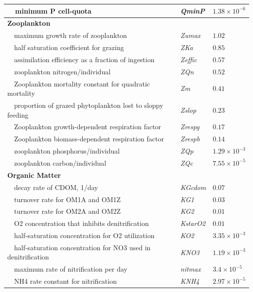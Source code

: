 \documentclass[preprint]{elsarticle}\usepackage[]{graphicx}\usepackage[]{color}
\begin{document}
\begin{table}[!tbp]
{\begin{center}
\begin{tabular}{lll}
~~minimum P cell-quota&\textit{QminP}&$1.38\times 10^{-6}$\tabularnewline
\hline
{\bfseries Zooplankton}&&\tabularnewline
~~maximum growth rate of zooplankton&\textit{Zumax}&$1.02$\tabularnewline
~~half saturation coefficient for grazing&\textit{ZKa}&$0.85$\tabularnewline
~~assimilation efficiency as a fraction of ingestion&\textit{Zeffic}&$0.57$\tabularnewline
~~zooplankton nitrogen/individual&\textit{ZQn}&$0.52$\tabularnewline
~~Zooplankton mortality constant for quadratic mortality&\textit{Zm}&$0.41$\tabularnewline
~~proportion of grazed phytoplankton lost to sloppy feeding&\textit{Zslop}&$0.23$\tabularnewline
~~Zooplankton growth-dependent respiration factor&\textit{Zrespg}&$0.17$\tabularnewline
~~Zooplankton biomass-dependent respiration factor&\textit{Zrespb}&$0.14$\tabularnewline
~~zooplankton phosphorus/individual&\textit{ZQp}&$1.29\times 10^{-3}$\tabularnewline
~~zooplankton carbon/individual&\textit{ZQc}&$7.55\times 10^{-5}$\tabularnewline
\hline
{\bfseries Organic Matter}&&\tabularnewline
~~decay rate of CDOM, 1/day&\textit{KGcdom}&$0.07$\tabularnewline
~~turnover rate for OM1A and OM1Z&\textit{KG1}&$0.03$\tabularnewline
~~turnover rate for OM2A and OM2Z&\textit{KG2}&$0.01$\tabularnewline
~~O2 concentration that inhibits denitrification&\textit{KstarO2}&$0.01$\tabularnewline
~~half-saturation concentration for O2 utilization&\textit{KO2}&$3.35\times 10^{-3}$\tabularnewline
~~half-saturation concentration for NO3 used in denitrification&\textit{KNO3}&$1.19\times 10^{-3}$\tabularnewline
~~maximum rate of nitrification per day&\textit{nitmax}&$3.4\times 10^{-5}$\tabularnewline
~~NH4 rate constant for nitrification&\textit{KNH4}&$2.97\times 10^{-5}$\tabularnewline
\hline
\end{tabular}\end{center}}
\end{table}
\end{document}
